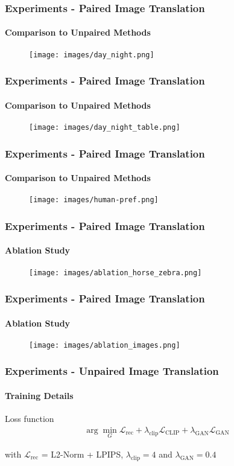 \begin{frame}
\frametitle{Experiments - Paired Image Translation}
\framesubtitle{Comparison to Unpaired Methods}
\begin{figure}
    \centering
    \texttt{[image: images/day\_night.png]}
    
\end{figure}
\end{frame}

\begin{frame}
    \frametitle{Experiments - Paired Image Translation}
    \framesubtitle{Comparison to Unpaired Methods}
    \begin{figure}
        \centering
        \texttt{[image: images/day\_night\_table.png]}
        
    \end{figure}
\end{frame}

\begin{frame}
    \frametitle{Experiments - Paired Image Translation}
    \framesubtitle{Comparison to Unpaired Methods}
    \begin{figure}
        \centering
        \texttt{[image: images/human-pref.png]}
        
    \end{figure}
\end{frame}


\begin{frame}
\frametitle{Experiments - Paired Image Translation}
\framesubtitle{Ablation Study}
\begin{figure}
    \centering
    \texttt{[image: images/ablation\_horse\_zebra.png]}
    
\end{figure}
\end{frame}

\begin{frame}
    \frametitle{Experiments - Paired Image Translation}
    \framesubtitle{Ablation Study}
    \begin{figure}
        \centering
        \texttt{[image: images/ablation\_images.png]}
        
    \end{figure}
    \end{frame}
\begin{frame}
\frametitle{Experiments - Unpaired Image Translation}
\framesubtitle{Training Details}
\begin{block}{Loss function}
    \begin{align}
        \arg \underset{G}{\min} \mathcal{L}_{\text{rec}} + \lambda _{\text{clip}} \mathcal{L}_{\text{CLIP}} + \lambda_{\text{GAN}}\mathcal{L}_{\text{GAN}}
    \end{align}
\end{block}
with $\mathcal{L}_{\text{rec}}$ = L2-Norm + LPIPS, $\lambda_{\text{clip}} = 4$ and $\lambda_{\text{GAN}} = 0.4$
\end{frame}

